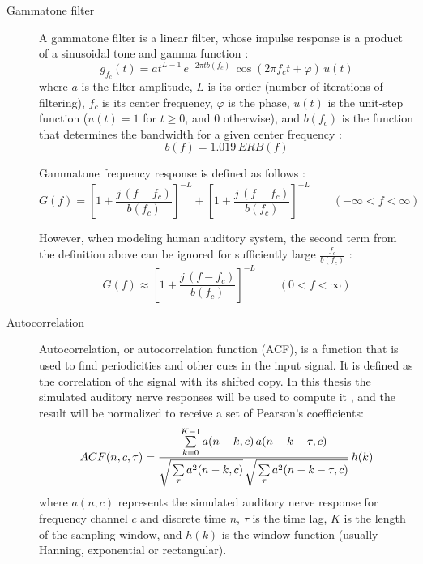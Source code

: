 \begin{description}
	\item[Gammatone filter] A gammatone filter is a linear filter, whose impulse response is a product of a sinusoidal tone and gamma function \cite{Wang2006}:
	\begin{equation}
		g_{f_c}(t) = at^{L-1}\,e^{-2\pi{}tb(f_c)}\,\cos(2\pi{}f_c{}t + \varphi)\,u(t)
		\label{equation:gammatone_impulse_response}
	\end{equation}
	where $a$ is the filter amplitude, $L$ is its order (number of iterations of filtering), $f_c$ is its center frequency, $\varphi$ is the phase, $u(t)$ is the unit-step function ($u(t) = 1$ for $t \ge 0$, and $0$ otherwise), and $b(f_c)$ is the function that determines the bandwidth for a given center frequency \cite{Wang2006}:
	\begin{equation}
		b(f) = 1.019\,ERB(f)
	\end{equation}
	
	Gammatone frequency response is defined as follows \cite{Holdsworth1988}:
	\begin{equation}
		G(f) = \left[1 + \frac{j\,(f - f_c)}{b(f_c)}\right]^{-L} + 
		\left[1 + \frac{j\,(f + f_c)}{b(f_c)}\right]^{-L}
		\qquad\left(-\infty < f < \infty\right)
	\end{equation}
	
	However, when modeling human auditory system, the second term from the definition above can be ignored for sufficiently large $\frac{f_c}{b(f_c)}$ \cite{Wang2006}\cite{Holdsworth1988}:
	\begin{equation}
		G(f)\approx\left[1 + \frac{j\,(f - f_c)}{b(f_c)}\right]^{-L}
		\qquad\left(0 < f < \infty\right)
	\end{equation}
	
	\item[Autocorrelation] Autocorrelation, or autocorrelation function (ACF), is a function that is used to find periodicities and other cues in the input signal. It is defined as the correlation of the signal with its shifted copy. In this thesis the simulated auditory nerve responses will be used to compute it \cite{Wang2006}, and the result will be normalized to receive a set of Pearson's coefficients:
	\begin{equation}
		ACF(n, c, \tau) = \frac{
			\sum\limits_{k=0}^{K-1}a(n - k, c)\,a(n - k -\tau, c)
		}{
			\sqrt{\strut\sum\limits_{\tau}{a^2(n - k, c)}}\,
			\sqrt{\strut\sum\limits_{\tau}{a^2(n - k - \tau, c)}}
		}\,h(k)
	\label{equation:ACF}
	\end{equation}
	where $a(n, c)$ represents the simulated auditory nerve response for frequency channel $c$ and discrete time $n$, $\tau$ is the time lag, $K$ is the length of the sampling window, and $h(k)$ is the window function (usually Hanning, exponential or rectangular).
	

\end{description}
